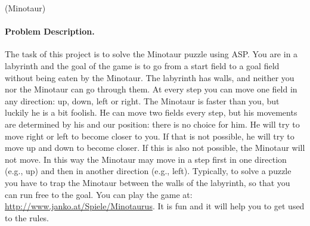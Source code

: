 \documentclass[a4paper,12pt]{article}
\begin{document}
\begin{PraktikumsAufgabe}{3}{(Minotaur)}
\paragraph{Problem Description.}
%
The task of this project is to solve the Minotaur puzzle using ASP.
You are in a labyrinth 
and the goal of the game is to go from a start field to a goal field 
without being eaten by the Minotaur.
The labyrinth has walls, and neither you nor the Minotaur can go through them.
At every step you can move one field in any direction: up, down, left or right. 
The Minotaur is faster than you, but luckily he is a bit foolish.
He can move two fields every step, but his movements are determined by his and our position: there is no choice for him.
He will try to move right or left to become closer to you.
If that is not possible, he will try to move up and down to become closer.
If this is also not possible, the Minotaur will not move.
In this way the Minotaur may move in a step first in one direction (e.g., up) and then in another direction (e.g., left).
Typically, to solve a puzzle you have to trap the Minotaur between the walls of the labyrinth, 
so that you can run free to the goal. 
You can play the game at:
\url{http://www.janko.at/Spiele/Minotaurus}.
It is fun and it will help you to get used to the rules.


\end{PraktikumsAufgabe}
\end{document}
